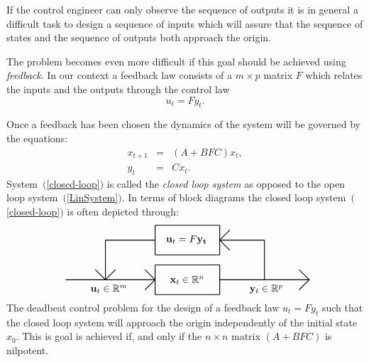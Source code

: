 \documentclass[12pt]{report}
\numberwithin{equation}{chapter}
\numberwithin{figure}{chapter}
\newcommand{\eqr}[1]{~\mbox{$(${\rm \ref{#1}}$)$}}
\begin{document}
If the control engineer can only observe the sequence of outputs
it is in general a difficult task to design a sequence of inputs
which will assure that the sequence of states and the sequence of
outputs both approach the origin.

The problem becomes even more difficult if this goal should be
achieved using {\em feedback}.  In our context a
feedback law consists of a $m\times p$ matrix $F$ which relates
the inputs and the outputs through the control law
$$
u_t=Fy_t.
$$

Once a feedback has been chosen the dynamics of the system will
be governed by the equations:
\begin{equation}                \label{closed-loop}
  \begin{array}{rcl}
    x_{t+1} & = & (A+BFC)x_t,\\
     y_{t} & = & Cx_t.
  \end{array}
\end{equation}
System\eqr{closed-loop} is called the {\em closed loop system}
%
as opposed to the open loop system\eqr{LinSystem}.
%
In terms of block diagrams the closed loop
system\eqr{closed-loop} is often depicted through:
$$
\begin{picture}(240,70)
\thicklines
 \put( 40,55){\line( 1, 0){50}}
 \put( 40,55){\line( 0,-1){40}}
 \put( 30,25){\line( 1,-1){10}}
 \put( 50,25){\line(-1,-1){10}}

 \put( 90,40){\line(1,0){65}} 
 \put( 90,70){\line(1,0){65}}
 \put( 90,40){\line(0,1){30}}  
 \put(155,40){\line(0,1){30}}
 \put(101,53){${\mathbf u_t}=F{\bf y_t}$}

 \put(200,55){\line(-1, 0){45}}
 \put(200,55){\line( 0,-1){40}}
 \put(155,55){\line( 1, 1){10}}
 \put(155,55){\line( 1,-1){10}}
 
 \put(  0,15){\line(1, 0){90}}   
 \put( 80,25){\line(1,-1){10}}   
 \put( 80, 5){\line(1, 1){10}}   
 \put( 25, 3){${\mathbf u_t}\in{\mathbb R}^m$}

 \put( 90, 0){\line(1,0){65}} 
 \put( 90,30){\line(1,0){65}}
 \put( 90, 0){\line(0,1){30}}  
 \put(155, 0){\line(0,1){30}}
 \put(105,12){${\mathbf x_t}\in{\mathbb R}^n$}

 \put(155,15){\line(1,0){90}}
 \put(235,25){\line(1,-1){10}}
 \put(235, 5){\line(1, 1){10}}
 \put(185, 3){${\mathbf y_t}\in{\mathbb R}^p$}
\end{picture}
$$
The deadbeat control problem 
%
for the design of a feedback law $u_t=Fy_t$ such that the closed
loop system will approach the origin independently of the initial
state $x_0$. This is goal is achieved if, and only if the
$n\times n$ matrix $(A+BFC)$ is
nilpotent.
\end{document}
